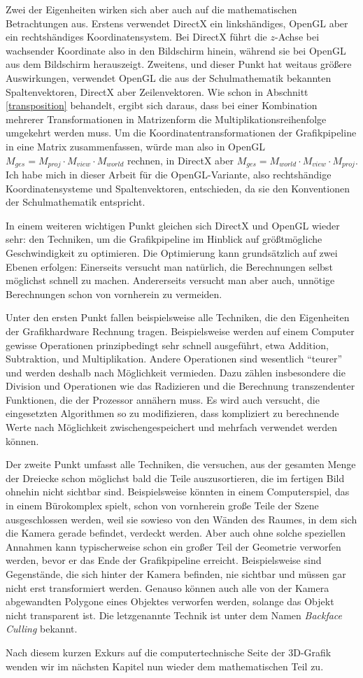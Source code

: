 Zwei der Eigenheiten wirken sich aber auch auf die mathematischen Betrachtungen aus. Erstens verwendet DirectX ein linkshändiges, OpenGL aber ein rechtshändiges Koordinatensystem. Bei DirectX führt die $z$-Achse bei wachsender Koordinate also in den Bildschirm hinein, während sie bei OpenGL aus dem Bildschirm herauszeigt. Zweitens, und dieser Punkt hat weitaus größere Auswirkungen, verwendet OpenGL die aus der Schulmathematik bekannten Spaltenvektoren, DirectX aber Zeilenvektoren. Wie schon in Abschnitt \ref{transposition} behandelt, ergibt sich daraus, dass bei einer Kombination mehrerer Transformationen in Matrizenform die Multiplikationsreihenfolge umgekehrt werden muss. Um die Koordinatentransformationen der Grafikpipeline in eine Matrix zusammenfassen, würde man also in OpenGL $M_{ges} = M_{proj} \cdot M_{view} \cdot M_{world}$ rechnen, in DirectX aber $M_{ges} = M_{world} \cdot M_{view} \cdot M_{proj}$. Ich habe mich in dieser Arbeit für die OpenGL-Variante, also rechtshändige Koordinatensysteme und Spaltenvektoren, entschieden, da sie den Konventionen der Schulmathematik entspricht.

\label{performance}
In einem weiteren wichtigen Punkt gleichen sich DirectX und OpenGL wieder sehr: den Techniken, um die Grafikpipeline im Hinblick auf größtmögliche Geschwindigkeit zu optimieren. Die Optimierung kann grundsätzlich auf zwei Ebenen erfolgen: Einerseits versucht man natürlich, die Berechnungen selbst möglichst schnell zu machen. Andererseits versucht man aber auch, unnötige Berechnungen schon von vornherein zu vermeiden.

Unter den ersten Punkt fallen beispielsweise alle Techniken, die den Eigenheiten der Grafikhardware Rechnung tragen. Beispielsweise werden auf einem Computer gewisse Operationen prinzipbedingt sehr schnell ausgeführt, etwa Addition, Subtraktion, und Multiplikation. Andere Operationen sind wesentlich \enquote{teurer} und werden deshalb nach Möglichkeit vermieden. Dazu zählen insbesondere die Division und Operationen wie das Radizieren und die Berechnung transzendenter Funktionen, die der Prozessor annähern muss. Es wird auch versucht, die eingesetzten Algorithmen so zu modifizieren, dass kompliziert zu berechnende Werte nach Möglichkeit zwischengespeichert und mehrfach verwendet werden können.

Der zweite Punkt umfasst alle Techniken, die versuchen, aus der gesamten Menge der Dreiecke schon möglichst bald die Teile auszusortieren, die im fertigen Bild ohnehin nicht sichtbar sind. Beispielsweise könnten in einem Computerspiel, das in einem Bürokomplex spielt, schon von vornherein große Teile der Szene ausgeschlossen werden, weil sie sowieso von den Wänden des Raumes, in dem sich die Kamera gerade befindet, verdeckt werden. Aber auch ohne solche speziellen Annahmen kann typischerweise schon ein großer Teil der Geometrie verworfen werden, bevor er das Ende der Grafikpipeline erreicht. Beispielsweise sind Gegenstände, die sich hinter der Kamera befinden, nie sichtbar und müssen gar nicht erst transformiert werden. Genauso können auch alle von der Kamera abgewandten Polygone eines Objektes verworfen werden, solange das Objekt nicht transparent ist. Die letzgenannte Technik ist unter dem Namen \emph{Backface Culling} bekannt.

Nach diesem kurzen Exkurs auf die computertechnische Seite der 3D-Grafik wenden wir im nächsten Kapitel nun wieder dem mathematischen Teil zu.